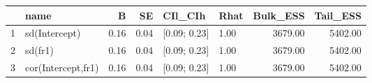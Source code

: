 \begin{table}[ht]
\centering
\begin{tabular}{rlrrllrr}
  \toprule
 & name & B & SE & CIl\_CIh & Rhat & Bulk\_ESS & Tail\_ESS \\ 
  \midrule
1 & sd(Intercept) & 0.16 & 0.04 & [0.09; 0.23] & 1.00 & 3679.00 & 5402.00 \\ 
  2 & sd(fr1) & 0.16 & 0.04 & [0.09; 0.23] & 1.00 & 3679.00 & 5402.00 \\ 
  3 & cor(Intercept,fr1) & 0.16 & 0.04 & [0.09; 0.23] & 1.00 & 3679.00 & 5402.00 \\ 
   \bottomrule
\end{tabular}
\end{table}

